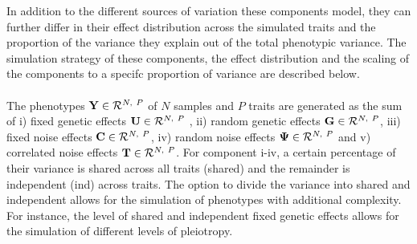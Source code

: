 In addition to the different sources of variation these components model, they can further differ in their effect distribution across the simulated traits and the proportion of the variance they explain out of the total phenotypic variance. The simulation strategy of these components, the effect distribution and the scaling of the components to a specifc proportion of variance are described below. 
\\
\\
The phenotypes \( \boldsymbol{\mathbf{Y}} \in \mathcal{R}^{N,~P}\) of \(N\) samples and \(P\) traits are generated as the sum of i) fixed genetic effects \( \boldsymbol{\mathbf{U}}  \in \mathcal{R}^{N,~P}\) , ii) random genetic effects \( \boldsymbol{\mathbf{G}} \in \mathcal{R}^{N,~P}\), iii) fixed noise effects \( \boldsymbol{\mathbf{C}} \in \mathcal{R}^{N,~P}\), iv) random noise effects \( \boldsymbol{\mathbf{\Psi}} \in \mathcal{R}^{N,~P}\) and v) correlated noise effects \( \boldsymbol{\mathbf{T}} \in \mathcal{R}^{N,~P}\). For component i-iv, a certain percentage of their variance is shared across all traits (shared) and the remainder is independent (ind) across traits. The option to divide the variance into shared and independent allows for the simulation of phenotypes with additional complexity. For instance, the level of shared and independent fixed genetic effects allows for the simulation of different levels of pleiotropy.

